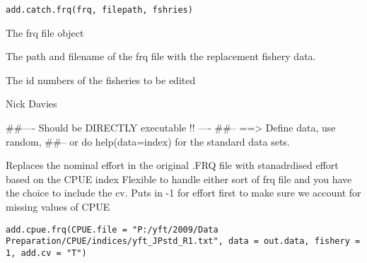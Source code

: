 \documentclass[a4paper]{book}
\begin{document}
%
\begin{Usage}
\begin{verbatim}
add.catch.frq(frq, filepath, fshries)
\end{verbatim}
\end{Usage}
%
\begin{Arguments}
\begin{ldescription}
\item[\code{frq}] 

The frq file object

\item[\code{filepath}] 

The path and filename of the frq file with the replacement fishery data. 

\item[\code{fshries}] 

The id numbers of the fisheries to be edited 

\end{ldescription}
\end{Arguments}
%
\begin{Author}\relax

Nick Davies
\end{Author}
%
\begin{Examples}
\begin{ExampleCode}
##---- Should be DIRECTLY executable !! ----
##-- ==>  Define data, use random,
##--	or do  help(data=index)  for the standard data sets.

\end{ExampleCode}
\end{Examples}
%
\begin{Description}\relax
Replaces the nominal effort in the original .FRQ file with stanadrdised effort based on the CPUE index
Flexible to handle either sort of frq file and you have the choice to include the cv.  
Puts in -1 for effort first to make sure we account for missing values of CPUE 
\end{Description}
%
\begin{Usage}
\begin{verbatim}
add.cpue.frq(CPUE.file = "P:/yft/2009/Data Preparation/CPUE/indices/yft_JPstd_R1.txt", data = out.data, fishery = 1, add.cv = "T")
\end{verbatim}
\end{Usage}
%
\begin{Arguments}
\begin{ldescription}
\item[\code{CPUE.file}] 


\item[\code{data}] 


\item[\code{fishery}] 


\item[\code{add.cv}] 


\end{ldescription}
\end{Arguments}
\end{document}

